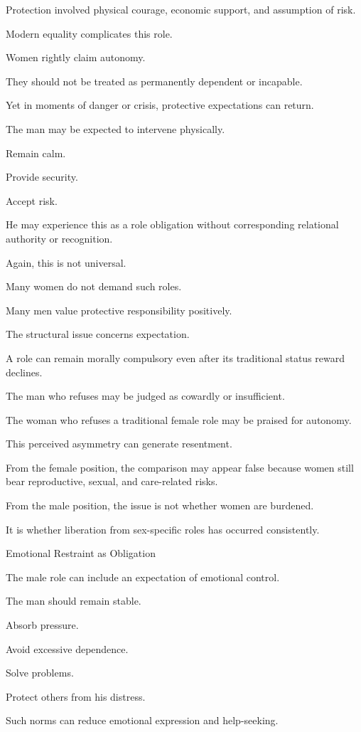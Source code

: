 Protection involved physical courage, economic support, and assumption of risk.

Modern equality complicates this role.

Women rightly claim autonomy.

They should not be treated as permanently dependent or incapable.

Yet in moments of danger or crisis, protective expectations can return.

The man may be expected to intervene physically.

Remain calm.

Provide security.

Accept risk.

He may experience this as a role obligation without corresponding relational authority or recognition.

Again, this is not universal.

Many women do not demand such roles.

Many men value protective responsibility positively.

The structural issue concerns expectation.

A role can remain morally compulsory even after its traditional status reward declines.

The man who refuses may be judged as cowardly or insufficient.

The woman who refuses a traditional female role may be praised for autonomy.

This perceived asymmetry can generate resentment.

From the female position, the comparison may appear false because women still bear reproductive, sexual, and care-related risks.

From the male position, the issue is not whether women are burdened.

It is whether liberation from sex-specific roles has occurred consistently.

Emotional Restraint as Obligation

The male role can include an expectation of emotional control.

The man should remain stable.

Absorb pressure.

Avoid excessive dependence.

Solve problems.

Protect others from his distress.

Such norms can reduce emotional expression and help-seeking.

